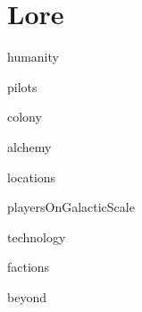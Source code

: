 \part{Lore}

{humanity}    
\newpage

{pilots}    
\newpage

{colony}    
\newpage

{alchemy}    
\newpage

{locations}    
\newpage

{playersOnGalacticScale}    
\newpage

{technology}    
\newpage

{factions}    
\newpage

{beyond}    
\newpage